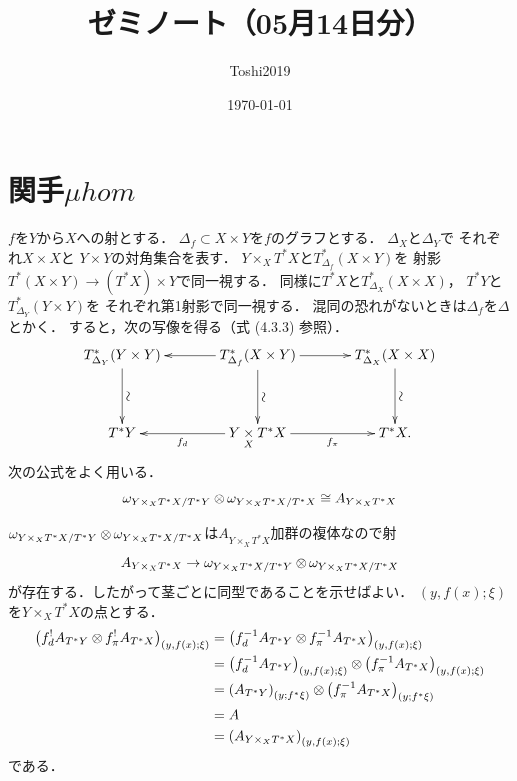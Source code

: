 \documentclass[leqno, 10pt, a4paper, dvipdfmx]{jsarticle}
\title{ゼミノート（05月14日分）}
\author{Toshi2019}
\date{\today}
\makeatletter
\theoremstyle{definition}
\renewenvironment{proof}[1][\proofname]{\par
  \pushQED{\qed}%
  \normalfont \topsep6\p@\@plus6\p@\relax
  \trivlist
  \item[\hskip\labelsep
         \bfseries
    {#1}]\ignorespaces
}{%
  \popQED\endtrivlist\@endpefalse
}
\renewcommand{\proofname}{証明.}
\numberwithin{equation}{section}
\newcommand{\tens}[1][]{\mathbin{\otimes_{\raise1.5ex\hbox to-.1em{}{#1}}}}
\newcommand{\pb}[1][]{\mathbin{\mathop{\times}\limits_{#1}}}
\theoremstyle{mystyle}
\newcommand{\mpb}[1][]{{#1}_{\pi}} %
\newcommand{\mdiff}[1][]{{#1}_{d}} %
\newcommand{\cotb}[1][]{T^{\ast}{#1}}
\newcommand{\muhom}{\mu hom}
\newcommand{\mucat}[2][]{\mathsf{D}^{\mathrm{b}}_{#1}(#2)}
\newcommand{\diag}[1][]{\Delta_{#1}}
\makeatother
\begin{document}
\maketitle
\tableofcontents
\section{関手\(\muhom\)}
\(f\)を\(Y\)から\(X\)への射とする．
\(\diag[f]\subset X\times Y\)を\(f\)のグラフとする．
\(\diag[X]\)と\(\diag[Y]\)で
それぞれ\(X\times X\)と
\(Y\times Y\)の対角集合を表す．
\(Y\mathbin{\times_{X}}\cotb[X]\)と\(T^{\ast}_{\diag[f]}(X\times Y)\)を
射影\(\cotb[(X\times Y)]\to(\cotb[X])\times Y\)で同一視する．
同様に\(\cotb[X]\)と\(T^{\ast}_{\diag[X]}(X\times X)\)，
\(\cotb[Y]\)と\(T^{\ast}_{\diag[Y]}(Y\times Y)\)を
それぞれ第1射影で同一視する．
混同の恐れがないときは\(\diag[f]\)を\(\diag\)とかく．
すると，次の写像を得る（式 (4.3.3) 参照）．
\begin{equation}\label{eq:4.4.1}
  \vcenter{\xymatrix@C=36pt@R=36pt{
    T^{\ast}_{\diag[Y]}(Y\times Y)
    \ar[d]^-{\rotatebox{90}{\(\sim\)}}
    &
    T^{\ast}_{\diag[f]}(X\times Y)
    \ar[d]^-{\rotatebox{90}{\(\sim\)}}
    \ar[l]
    \ar[r]
    &
    T^{\ast}_{\diag[X]}(X\times X)
    \ar[d]^-{\rotatebox{90}{\(\sim\)}}
    \\
    \cotb[Y]
    &
    Y\pb[X]\cotb[X]
    \ar[l]^-{\mdiff[f]}
    \ar[r]_-{\mpb[f]}
    &
    \cotb[X].
  }}
\end{equation}
次の公式をよく用いる．
\begin{equation}\label{eq:4.4.2}
  \omega_{{Y\mathbin{\times_{X}}\cotb[X]}\mathbin{/}\cotb[Y]}
  \tens[]
  \omega_{{Y\mathbin{\times_{X}}\cotb[X]}\mathbin{/}\cotb[X]}
  \cong
  A_{Y\mathbin{\times_{X}}\cotb[X]}
\end{equation}
\begin{proof}
  \(
    \omega_{{Y\mathbin{\times_{X}}\cotb[X]}\mathbin{/}\cotb[Y]}
    \tens[]
    \omega_{{Y\mathbin{\times_{X}}\cotb[X]}\mathbin{/}\cotb[X]}
  \)は\(A_{Y\mathbin{\times_{X}}\cotb[X]}\)加群の複体なので射
  \[
    A_{Y\mathbin{\times_{X}}\cotb[X]}
    \to
    \omega_{{Y\mathbin{\times_{X}}\cotb[X]}\mathbin{/}\cotb[Y]}
    \tens[]
    \omega_{{Y\mathbin{\times_{X}}\cotb[X]}\mathbin{/}\cotb[X]}
  \]
  が存在する．したがって茎ごとに同型であることを示せばよい．
  \((y,f(x);\xi)\)を\(Y\mathbin{\times_{X}}\cotb[X]\)の点とする．
  \begin{align*}
    \left(
      \mdiff[f]^{!}A_{\cotb[Y]}\tens[]\mpb[f]^{!}A_{\cotb[X]}
    \right)_{(y,f(x);\xi)}
    &=\left(
      \mdiff[f]^{-1}A_{\cotb[Y]}\tens[]\mpb[f]^{-1}A_{\cotb[X]}
    \right)_{(y,f(x);\xi)}\\
    &=\left(\mdiff[f]^{-1}A_{\cotb[Y]}\right)_{(y,f(x);\xi)}
    \tens[]\left(\mpb[f]^{-1}A_{\cotb[X]}
    \right)_{(y,f(x);\xi)}\\
    &=\left(A_{\cotb[Y]}\right)_{(y;f^{\ast}\xi)}
    \tens[]\left(\mpb[f]^{-1}A_{\cotb[X]}
    \right)_{(y;f^{\ast}\xi)}\\
    &=A\\
    &=\left(A_{Y\mathbin{\times_{X}}\cotb[X]}\right)_{(y,f(x);\xi)}
  \end{align*}
  である．
\end{proof}
\end{document}

